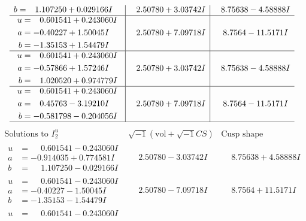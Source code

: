 \documentclass[1p]{elsarticle_modified}
\theoremstyle{definition}
\newcommand{\I}{\sqrt{-1}}
\begin{document}
$$\begin{array}{c|c|c}
\begin{aligned}
b &= \phantom{-}1.107250 + 0.029166 I\end{aligned}
 & \phantom{-}2.50780 + 3.03742 I & \phantom{-}8.75638 - 4.58888 I \\ \hline\begin{aligned}
u &= \phantom{-}0.601541 + 0.243060 I \\
a &= -0.40227 + 1.50045 I \\
b &= -1.35153 + 1.54479 I\end{aligned}
 & \phantom{-}2.50780 + 7.09718 I & \phantom{-}8.7564 - 11.5171 I \\ \hline\begin{aligned}
u &= \phantom{-}0.601541 + 0.243060 I \\
a &= -0.57866 + 1.57246 I \\
b &= \phantom{-}1.020520 + 0.974779 I\end{aligned}
 & \phantom{-}2.50780 + 3.03742 I & \phantom{-}8.75638 - 4.58888 I \\ \hline\begin{aligned}
u &= \phantom{-}0.601541 + 0.243060 I \\
a &= \phantom{-}0.45763 - 3.19210 I \\
b &= -0.581798 - 0.204056 I\end{aligned}
 & \phantom{-}2.50780 + 7.09718 I & \phantom{-}8.7564 - 11.5171 I\\
 \hline 
 \end{array}$$\newpage$$\begin{array}{c|c|c}  
\text{Solutions to }I^u_{2}& \I (\text{vol} + \sqrt{-1}CS) & \text{Cusp shape}\\
 \hline 
\begin{aligned}
u &= \phantom{-}0.601541 - 0.243060 I \\
a &= -0.914035 + 0.774581 I \\
b &= \phantom{-}1.107250 - 0.029166 I\end{aligned}
 & \phantom{-}2.50780 - 3.03742 I & \phantom{-}8.75638 + 4.58888 I \\ \hline\begin{aligned}
u &= \phantom{-}0.601541 - 0.243060 I \\
a &= -0.40227 - 1.50045 I \\
b &= -1.35153 - 1.54479 I\end{aligned}
 & \phantom{-}2.50780 - 7.09718 I & \phantom{-}8.7564 + 11.5171 I \\ \hline\begin{aligned}
u &= \phantom{-}0.601541 - 0.243060 I \\

\end{aligned}
\end{array}$$
\end{document}

